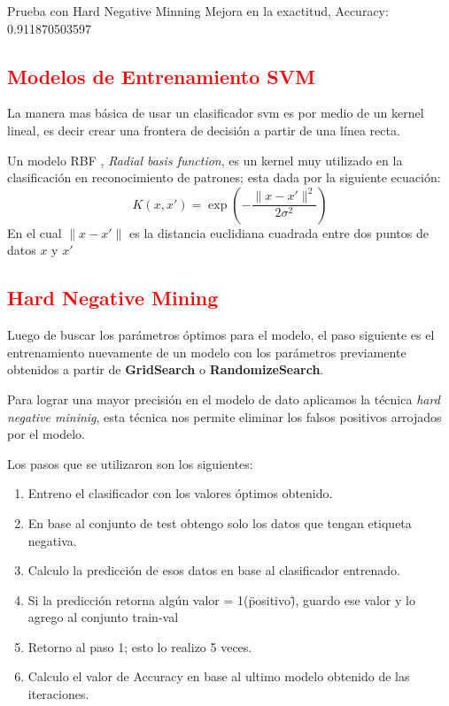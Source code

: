 Prueba con Hard Negative Minning
Mejora en la exactitud, Accuracy: 0.911870503597





\textcolor{red}{\subsection{Modelos de Entrenamiento SVM}\label{sub:linealModel}}

La manera mas básica de usar un clasificador \ac{svm} es por medio de un kernel lineal, es decir crear una frontera de decisión a partir de una línea 
recta. 

Un modelo RBF , \textit{Radial basis function}, es un kernel muy utilizado en la clasificación en reconocimiento de patrones; esta dada por la siguiente ecuación:
\begin{equation}
K(x,x')=\exp(-\frac{ \|x-x'\|^2}{2\sigma^2} )
\end{equation}\label{ec: ecuacionrbf}
En el cual \(\|x-x'\|\) es la distancia euclidiana cuadrada entre dos puntos de datos \(x\) y \(x'\)






\textcolor{red}{\subsection{Hard Negative Mining}\label{sub:hardnegativemining}}

Luego de buscar los parámetros óptimos para el modelo, el paso siguiente es el entrenamiento nuevamente de un modelo con los parámetros previamente obtenidos a partir de \textbf{GridSearch} o \textbf{RandomizeSearch}.

Para lograr una mayor precisión en el modelo de dato aplicamos la técnica \textit{hard negative mininig}, esta técnica nos permite eliminar los falsos positivos arrojados por el modelo.

Los pasos que se utilizaron son los siguientes:
\begin{enumerate}
	\item Entreno el clasificador con los valores óptimos obtenido.
	\item En base al conjunto de test obtengo solo los datos que tengan etiqueta negativa.
	\item Calculo la predicción de esos datos en base al clasificador entrenado.
	\item Si la predicción retorna algún valor = 1(\"positivo\"), guardo ese valor y lo agrego al conjunto train-val
	\item Retorno al paso 1; esto lo realizo 5 veces.
	\item Calculo el valor de Accuracy en base al ultimo modelo obtenido de las iteraciones.
\end{enumerate}

